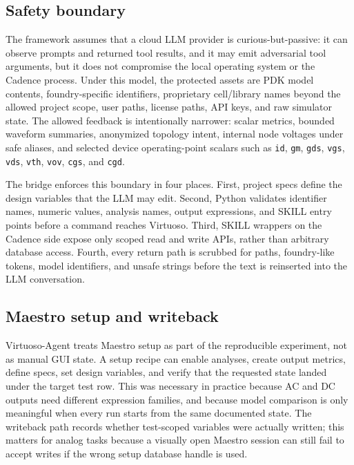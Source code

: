\documentclass[acmsmall,review,anonymous]{acmart}
\newcommand{\framework}{Virtuoso-Agent}
\newcommand{\metric}[1]{\texttt{#1}}
\begin{document}
\subsection{Safety boundary}

The framework assumes that a cloud LLM provider is curious-but-passive: it can
observe prompts and returned tool results, and it may emit adversarial tool
arguments, but it does not compromise the local operating system or the Cadence
process. Under this model, the protected assets are PDK model contents,
foundry-specific identifiers, proprietary cell/library names beyond the
allowed project scope, user paths, license paths, API keys, and raw simulator
state. The allowed feedback is intentionally narrower: scalar metrics, bounded
waveform summaries, anonymized topology intent, internal node voltages under
safe aliases, and selected device operating-point scalars such as
\metric{id}, \metric{gm}, \metric{gds}, \metric{vgs}, \metric{vds},
\metric{vth}, \metric{vov}, \metric{cgs}, and \metric{cgd}.

The bridge enforces this boundary in four places. First, project specs define
the design variables that the LLM may edit. Second, Python validates
identifier names, numeric values, analysis names, output expressions, and SKILL
entry points before a command reaches Virtuoso. Third, SKILL wrappers on the
Cadence side expose only scoped read and write APIs, rather than arbitrary
database access. Fourth, every return path is scrubbed for paths, foundry-like
tokens, model identifiers, and unsafe strings before the text is reinserted
into the LLM conversation.

\subsection{Maestro setup and writeback}

\framework{} treats Maestro setup as part of the reproducible experiment, not
as manual GUI state. A setup recipe can enable analyses, create output
metrics, define specs, set design variables, and verify that the requested
state landed under the target test row. This was necessary in practice because
AC and DC outputs need different expression families, and because model
comparison is only meaningful when every run starts from the same documented
state. The writeback path records whether test-scoped variables were actually
written; this matters for analog tasks because a visually open Maestro session
can still fail to accept writes if the wrong setup database handle is used.
\end{document}
